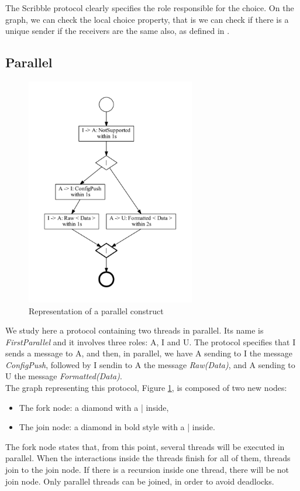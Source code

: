 \documentclass[a4paper,11pt,twoside]{report}
\begin{document}
The Scribble protocol clearly specifies the role responsible for the choice. On the graph, we can check the local choice property, that is we can check if there is a unique sender if the receivers are the same also, as defined in \cite{denielou2012multiparty}.

\subsection{Parallel}
\begin{figure}[h]
\begin{center}
\includegraphics[height=10cm]{Parallel}\caption{Representation of a parallel construct}
\label{fig:Parallel}
\end{center}
\end{figure}
We study here a protocol containing two threads in parallel. Its name is \emph{FirstParallel} and it involves three roles: A, I and U. The protocol specifies that I sends a message to A, and then, in parallel, we have A sending to I the message \emph{ConfigPush}, followed by I sendin to A the message \emph{Raw(Data)}, and A sending to U the message \emph{Formatted(Data)}.\\
The graph representing this protocol, Figure \ref{fig:Parallel}, is composed of two new nodes:
\begin{itemize}
\item The fork node: a diamond with a | inside,
\item The join node: a diamond in bold style with a | inside.
\end{itemize}
The fork node states that, from this point, several threads will be executed in parallel. When the interactions inside the threads finish for all of them, threads join to the join node. If there is a recursion inside one thread, there will be not join node. Only parallel threads can be  joined, in order to avoid deadlocks.
\end{document}
